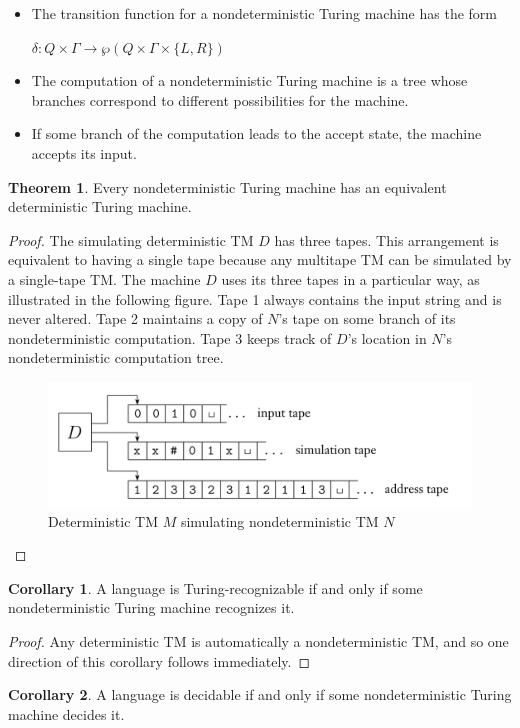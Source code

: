 \documentclass[11pt]{article}
\theoremstyle{definition}
\newtheorem{thm}{Theorem}[section]
\newtheorem{cor}{Corollary}[thm]
\begin{document}
\begin{itemize}[leftmargin=*]
    \item The transition function for a nondeterministic Turing machine has the form
    \begin{center}
        $\delta:Q\times\Gamma\to\wp(Q\times\Gamma\times\{L,R\})$
    \end{center}
    \item The computation of a nondeterministic Turing machine is a tree whose branches correspond to different possibilities for the machine. 
    \item If some branch of the computation leads to the accept state, the machine accepts its input.
\end{itemize}
\begin{thm}
    Every nondeterministic Turing machine has an equivalent deterministic Turing machine.
\end{thm}
\begin{proof}
    The simulating deterministic TM $D$ has three tapes. This arrangement is equivalent to having a single tape because any multitape TM can be simulated by a single-tape TM. The machine $D$ uses its three tapes in a particular way, as illustrated in the following figure. Tape 1 always contains the input string and is never altered. Tape 2 maintains a copy of $N$'s tape on some branch of its nondeterministic computation. Tape 3 keeps track of $D$'s location in $N$'s nondeterministic computation tree.
    \begin{figure}[H]
    	\centering
    	\includegraphics[width=0.5\linewidth]{ndtm.png}
    	\caption{Deterministic TM $M$ simulating nondeterministic TM $N$}
    	\label{fig}
    \end{figure}
\end{proof}
\begin{cor}
        A language is Turing-recognizable if and only if some nondeterministic Turing machine recognizes it.
\end{cor}
\begin{proof}
    Any deterministic TM is automatically a nondeterministic TM, and so one direction of this corollary follows immediately. 
\end{proof}
\begin{cor}
    A language is decidable if and only if some nondeterministic Turing machine
decides it.
\end{cor}
\end{document}
